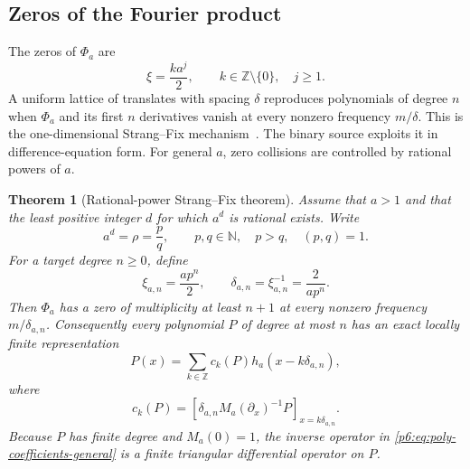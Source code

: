 \documentclass[11pt,oneside]{article}
\numberwithin{equation}{section}
\newtheorem{theorem}{Theorem}[section]
\theoremstyle{definition}
\theoremstyle{remark}
\newcommand{\N}{\mathbb N}
\newcommand{\Z}{\mathbb Z}
\begin{document}
\subsection{Zeros of the Fourier product}

The zeros of $\Phi_a$ are
\begin{equation}\label{p6:eq:Phi-zeros}
 \xi=\frac{k a^j}{2},
 \qquad k\in\Z\setminus\{0\},\quad j\ge1.
\end{equation}
A uniform lattice of translates with spacing $\delta$ reproduces polynomials of
degree $n$ when $\Phi_a$ and its first $n$ derivatives vanish at every nonzero
frequency $m/\delta$.  This is the one-dimensional Strang--Fix mechanism~\cite{p6:strang-fix,p6:deboor-ron}.  The
binary source exploits it in difference-equation form.  For general $a$, zero
collisions are controlled by rational powers of $a$.

\begin{theorem}[Rational-power Strang--Fix theorem]\label{p6:thm:rational-power-SF}
Assume that $a>1$ and that the least positive integer $d$ for which $a^d$ is
rational exists.  Write
\begin{equation}\label{p6:eq:rational-power}
 a^d=\rho=\frac pq,
 \qquad p,q\in\N,\quad p>q,\quad (p,q)=1.
\end{equation}
For a target degree $n\ge0$, define
\begin{equation}\label{p6:eq:lattice-spacing}
 \xi_{a,n}=\frac{ap^n}{2},
 \qquad
 \delta_{a,n}=\xi_{a,n}^{-1}=\frac{2}{ap^n}.
\end{equation}
Then $\Phi_a$ has a zero of multiplicity at least $n+1$ at every nonzero
frequency $m/\delta_{a,n}$.  Consequently every polynomial $P$ of degree at most
$n$ has an exact locally finite representation
\begin{equation}\label{p6:eq:poly-reproduction-general}
 P(x)=\sum_{k\in\Z}c_k(P)
 h_a(x-k\delta_{a,n}),
\end{equation}
where
\begin{equation}\label{p6:eq:poly-coefficients-general}
 c_k(P)=
 \left[
 \delta_{a,n}M_a(\partial_x)^{-1}P
 \right]_{x=k\delta_{a,n}}.
\end{equation}
Because $P$ has finite degree and $M_a(0)=1$, the inverse operator in
\eqref{p6:eq:poly-coefficients-general} is a finite triangular differential
operator on $P$.
\end{theorem}
\end{document}
